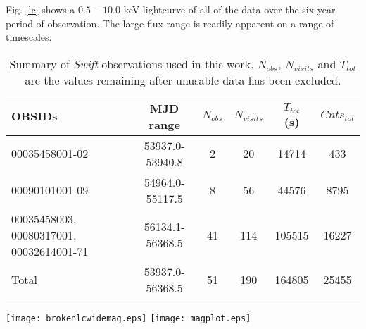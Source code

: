 \documentclass[useAMS,usenatbib]{sam}
\begin{document}

Fig. \ref{lc} shows a $0.5 - 10.0$ keV lightcurve of all of the data over the six-year period of observation. The large flux range is readily apparent on a range of
timescales.

\begin{table}
 	\centering
	\begin{tabular}{ l  c  c  c  c c }
		
	OBSIDs 							& MJD range 		& $N_{obs}$ 	& $N_{visits}$ 	& $T_{tot}$ (s) & $Cnts_{tot}$	\\ \hline\hline
	00035458001-02						& 53937.0-53940.8	& 2		& 20		& 14714		& 433		\\
	00090101001-09						& 54964.0-55117.5	& 8		& 56 		& 44576		& 8795		\\ 
	\multirow{3}{2.1cm}{00035458003, 00080317001, 00032614001-71} 	& 	&  		&  		& 					\\ 
								& 56134.1-56368.5	& 41		& 114		& 105515	& 16227		\\
								&			&		&		&		&		\\ 
	
	Total							& 53937.0-56368.5	& 51		& 190		& 164805	& 25455		\\ 

	\end{tabular}
		
	\caption{Summary of {\it Swift} observations used in this work. $N_{obs}$, $N_{visits}$ and $T_{tot}$  are the values remaining after unusable data has been
excluded.}
	\label{obstable}

\end{table}


\begin{figure*}
	\texttt{[image: brokenlcwidemag.eps]}
	\texttt{[image: magplot.eps]}
	\caption{{\it Left:} The {\it Swift} X-ray lightcurve of NGC 1365, with a broken axis where data were not taken. {\it Right:} Expanded plot of the highlighted
section
of the total light curve, during which more intensive {\it Swift} monitoring was taking place.}
	\label{lc}
\end{figure*}

\end{document}
